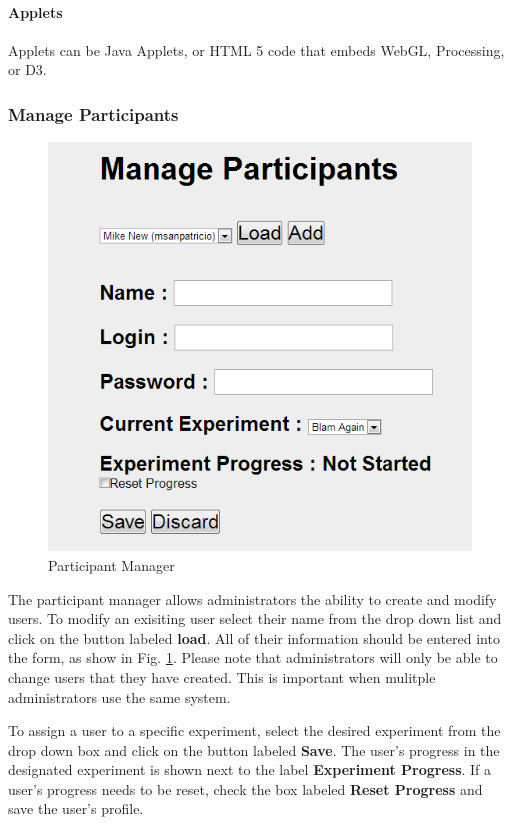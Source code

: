 \documentclass[article]{ij4uq}              %
\begin{document}
\paragraph{Applets}
Applets can be Java Applets, or HTML 5 code that embeds WebGL, Processing, or D3.


\subsubsection {Manage Participants}

\begin{figure}[h!]
 \centering
 \includegraphics[width=5.0in]{figures/manage_part.png}
 \caption{Participant Manager}
 \label{fig:managePart}
\end{figure}
\FloatBarrier

The participant manager allows administrators the ability to create and modify users.  To modify an exisiting user select their name from the drop down list and click on the button labeled \textbf{load}.  All of their information should be entered into the form, as show in Fig. \ref{fig:managePart}.  Please note that administrators will only be able to change users that they have created.  This is important when mulitple administrators use the same system.

To assign a user to a specific experiment, select the desired experiment from the drop down box and click on the button labeled \textbf{Save}.  The user's progress in the designated experiment is shown next to the label \textbf{Experiment Progress}.  If a user's progress needs to be reset, check the box labeled \textbf{Reset Progress} and save the user's profile.
\end{document}
